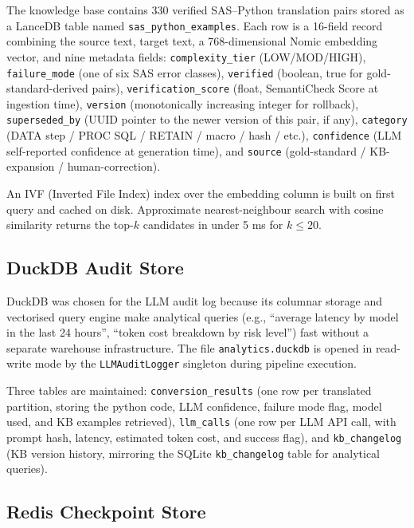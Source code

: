 The knowledge base contains 330 verified SAS--Python translation pairs stored
as a LanceDB table named \texttt{sas\_python\_examples}. Each row is a 16-field
record combining the source text, target text, a 768-dimensional Nomic embedding
vector, and nine metadata fields: \texttt{complexity\_tier} (LOW/MOD/HIGH),
\texttt{failure\_mode} (one of six SAS error classes), \texttt{verified}
(boolean, true for gold-standard-derived pairs), \texttt{verification\_score}
(float, SemantiCheck Score at ingestion time), \texttt{version} (monotonically
increasing integer for rollback), \texttt{superseded\_by} (UUID pointer to the
newer version of this pair, if any), \texttt{category} (DATA step / PROC SQL /
RETAIN / macro / hash / etc.), \texttt{confidence} (LLM self-reported confidence
at generation time), and \texttt{source} (gold-standard / KB-expansion /
human-correction).

An IVF (Inverted File Index) index over the embedding column is built on
first query and cached on disk. Approximate nearest-neighbour search with cosine
similarity returns the top-$k$ candidates in under 5 ms for $k \leq 20$.

\subsection{DuckDB Audit Store}
\label{subsec:duckdb-schema}

DuckDB was chosen for the LLM audit log because its columnar storage and
vectorised query engine make analytical queries (e.g., ``average latency by
model in the last 24 hours'', ``token cost breakdown by risk level'') fast
without a separate warehouse infrastructure. The file \texttt{analytics.duckdb}
is opened in read-write mode by the \texttt{LLMAuditLogger} singleton during
pipeline execution.

Three tables are maintained: \texttt{conversion\_results} (one row per
translated partition, storing the python code, LLM confidence, failure mode
flag, model used, and KB examples retrieved), \texttt{llm\_calls} (one row
per LLM API call, with prompt hash, latency, estimated token cost, and success
flag), and \texttt{kb\_changelog} (KB version history, mirroring the SQLite
\texttt{kb\_changelog} table for analytical queries).

\subsection{Redis Checkpoint Store}
\label{subsec:redis-schema}

